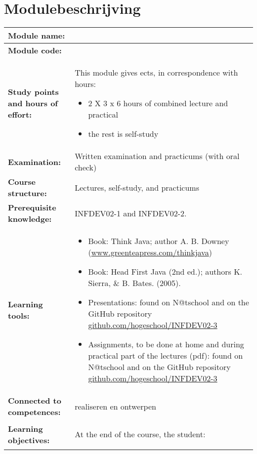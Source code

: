 \section*{Modulebeschrijving}
\begin{tabularx}{\textwidth}{|>{\columncolor{lichtGrijs}} p{}|X|}
	\hline
	\textbf{Module name:} & \modulenaam\\

	\hline
	\textbf{Module code: }& \modulecode\\
	\hline
	\textbf{Study points \newline and hours of effort:} & This module gives \stdPunten{}  ects, in correspondence with \FPeval{\result}{clip(\stdPunten*28)}\result{} hours:
	\begin{itemize}
		\item 2 X 3 x 6 hours of combined lecture and practical
		\item the rest is self-study
	\end{itemize} \\
	\hline
	\textbf{Examination:} & Written examination and practicums (with oral check) \\
	\hline
	\textbf{Course structure:} & Lectures, self-study, and practicums \\
	\hline
	\textbf{Prerequisite knowledge:} & INFDEV02-1 and INFDEV02-2. \\
	\hline
	\textbf{Learning tools:}  &
		\begin{itemize}
			\item Book: Think Java; author A. B. Downey (\href{http://www.greenteapress.com/thinkjava/}{www.greenteapress.com/thinkjava})
			\item Book: Head First Java (2nd ed.); authors K. Sierra, \& B. Bates. (2005).
			\item Presentations: found on N@tschool and on the GitHub repository \href{https://github.com/hogeschool/INFDEV02-3}{github.com/hogeschool/INFDEV02-3}
			\item Assignments, to be done at home and during practical part of the lectures (pdf): found on N@tschool and on the GitHub repository \href{https://github.com/hogeschool/INFDEV02-3}{github.com/hogeschool/INFDEV02-3}
		\end{itemize} \\
	\hline
	\textbf{Connected to competences:} & realiseren en ontwerpen \\
	\hline
	\textbf{Learning objectives:} &
		At the end of the course, the student:
			\begin{itemize}

\end{itemize}
\end{tabularx}
